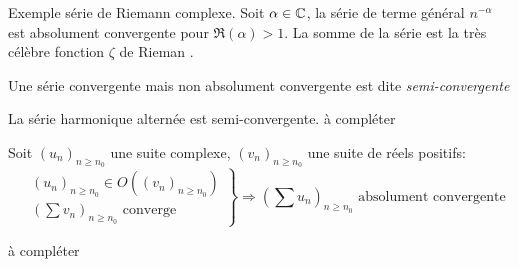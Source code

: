 \clearpage
{}
Exemple série de Riemann complexe. Soit $\alpha\in \mathbb{C}$, la série de terme général $n^{-\alpha}$ est absolument convergente pour $\Re(\alpha)>1$. La somme de la série est la très célèbre fonction $\zeta$ de Rieman .
\begin{defi}
  Une série convergente mais non absolument convergente est dite \emph{semi-convergente}
\end{defi}
\begin{exple}
La série harmonique alternée est semi-convergente.
à compléter 
\end{exple}

\begin{prop}
  Soit $\left( u_n\right)_{n\geq n_0}$ une suite complexe, $\left( v_n\right)_{n\geq n_0}$ une suite de réels positifs:
\begin{displaymath}
\left. 
\begin{aligned}
  &\left( u_n\right)_{n\geq n_0} \in O\left(\left( v_n\right)_{n\geq n_0} \right) \\
  & \left(\sum v_n\right)_{n\geq n_0} \text{ converge}
\end{aligned}
\right\rbrace \Rightarrow
\left( \sum u_n\right)_{n\geq n_0} \text{ absolument convergente}
\end{displaymath}
\end{prop}
\begin{demo}
  à compléter
\end{demo}
\clearpage
